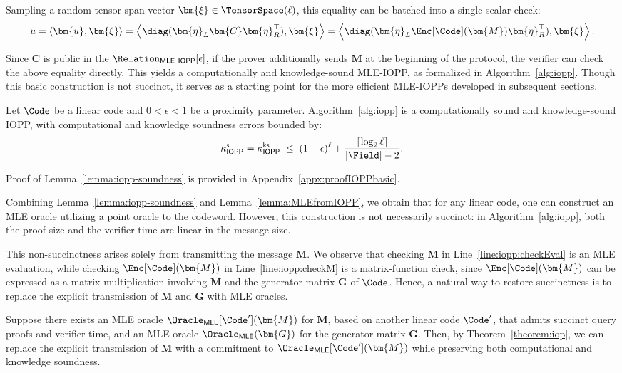 Sampling a random tensor-span vector $\bm{\xi}\in\TensorSpace(\ell)$, this equality can be
batched into a single scalar check:
\[
u
=
\langle \bm{u},\bm{\xi}\rangle
=
\left\langle \diag(\bm{\eta}_L \bm{C}\bm{\eta}_R^\top),\bm{\xi}\right\rangle
=
\left\langle \diag(\bm{\eta}_L \Enc[\Code](\bm{M})\bm{\eta}_R^\top),\bm{\xi}\right\rangle .
\]

Since $\bm{C}$ is public in the $\Relation_{\mathsf{MLE\mbox{-}IOPP}}[\epsilon]$,
if the prover additionally sends $\bm{M}$ at the beginning of the protocol,
the verifier can check the above equality directly.
This yields a computationally and knowledge-sound MLE-IOPP, as formalized in
Algorithm~\ref{alg:iopp}.
Though this basic construction is not succinct, it serves as a
starting point for the more efficient MLE-IOPPs developed in subsequent
sections.

\begin{lemma}
\label{lemma:iopp-soundness}
Let $\Code$ be a linear code and $0<\epsilon<1$ be a proximity parameter.
Algorithm~\ref{alg:iopp} is a computationally sound and knowledge-sound IOPP,
with computational and knowledge soundness errors bounded by:
\[
\kappa_{\mathsf{IOPP}}^{\mathsf{s}}
=
\kappa_{\mathsf{IOPP}}^{\mathsf{ks}}
\;\le\;
(1-\epsilon)^{\ell}
+
\frac{\lceil \log_2 \ell \rceil}{|\Field|-2}.
\]
\end{lemma}

Proof of Lemma~\ref{lemma:iopp-soundness} is provided in Appendix~\ref{appx:proofIOPPbasic}.



Combining Lemma~\ref{lemma:iopp-soundness} and Lemma~\ref{lemma:MLEfromIOPP}, we obtain that for any linear code,
one can construct an MLE oracle utilizing a point oracle to the codeword.
However, this construction is not necessarily succinct: in Algorithm~\ref{alg:iopp},
both the proof size and the verifier time are linear in the message size.

This non-succinctness arises solely from transmitting the message $\bm{M}$.
We observe that checking $\bm{M}$ in Line~\ref{line:iopp:checkEval} is an MLE
evaluation, while checking $\Enc[\Code](\bm{M})$ in
Line~\ref{line:iopp:checkM} is a matrix-function check, since
$\Enc[\Code](\bm{M})$ can be expressed as a matrix multiplication involving
$\bm{M}$ and the generator matrix $\bm{G}$ of $\Code$.
Hence, a natural way to restore succinctness is to replace the explicit
transmission of $\bm{M}$ and $\bm{G}$ with MLE oracles.


Suppose there exists an MLE oracle $\Oracle_{\mathsf{MLE}}[\Code'](\bm{M})$
for $\bm{M}$, based on another linear code $\Code'$, that admits succinct
query proofs and verifier time, and an MLE oracle
$\Oracle_{\mathsf{MLE}}(\bm{G})$ for the generator matrix $\bm{G}$.
Then, by Theorem~\ref{theorem:iop}, we can replace the explicit transmission
of $\bm{M}$ with a commitment to $\Oracle_{\mathsf{MLE}}[\Code'](\bm{M})$
while preserving both computational and knowledge soundness.

